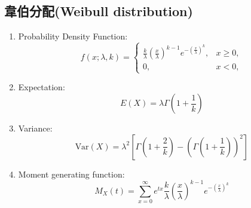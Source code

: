 \subsection{韋伯分配(Weibull distribution)}
\begin{enumerate}
\item Probability Density Function:$${\displaystyle f(x;\lambda ,k)={\begin{cases}{\frac {k}{\lambda }}\left({\frac {x}{\lambda }}\right)^{k-1}e^{-(\frac{x}{\lambda} )^{k}},&x\geq 0,\\0,&x<0,\end{cases}}}$$
\item Expectation:$$E(X) = \lambda \Gamma\left(1 + \frac{1}{k}\right)$$
\item Variance:$$\text{Var}(X) = \lambda^2 \left[\Gamma\left(1 + \frac{2}{k}\right) - \left(\Gamma\left(1 + \frac{1}{k}\right)\right)^2\right]$$
\item Moment generating function:$$M_X(t) = \sum_{x=0}^{\infty} e^{tx} \frac{k}{\lambda} \left(\frac{x}{\lambda}\right)^{k-1} e^{-(\frac{x}{\lambda})^k}$$
\end{enumerate}
